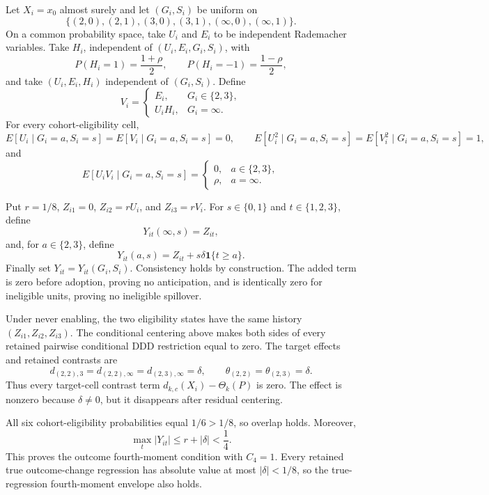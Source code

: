 Let \(X_i=x_0\) almost surely and let \((G_i,S_i)\) be uniform on
\[
 \{(2,0),(2,1),(3,0),(3,1),(\infty,0),(\infty,1)\}.
\]
On a common probability space, take \(U_i\) and \(E_i\) to be independent Rademacher variables.  Take \(H_i\), independent of \((U_i,E_i,G_i,S_i)\), with
\[
 P(H_i=1)=\frac{1+\rho}{2},
 \qquad
 P(H_i=-1)=\frac{1-\rho}{2},
\]
and take \((U_i,E_i,H_i)\) independent of \((G_i,S_i)\).  Define
\[
 V_i=
 \begin{cases}
 E_i,&G_i\in\{2,3\},\\
 U_iH_i,&G_i=\infty.
 \end{cases}
\]
For every cohort-eligibility cell,
\[
 E[U_i\mid G_i=a,S_i=s]=E[V_i\mid G_i=a,S_i=s]=0,
 \qquad
 E[U_i^2\mid G_i=a,S_i=s]=E[V_i^2\mid G_i=a,S_i=s]=1,
\]
and
\[
 E[U_iV_i\mid G_i=a,S_i=s]
 =\begin{cases}
 0,&a\in\{2,3\},\\
 \rho,&a=\infty.
 \end{cases}
\]

Put \(r=1/8\), \(Z_{i1}=0\), \(Z_{i2}=rU_i\), and \(Z_{i3}=rV_i\).  For \(s\in\{0,1\}\) and \(t\in\{1,2,3\}\), define
\[
 Y_{it}(\infty,s)=Z_{it},
\]
and, for \(a\in\{2,3\}\), define
\[
 Y_{it}(a,s)=Z_{it}+s\delta\mathbf 1\{t\ge a\}.
\]
Finally set \(Y_{it}=Y_{it}(G_i,S_i)\).  Consistency holds by construction.  The added term is zero before adoption, proving no anticipation, and is identically zero for ineligible units, proving no ineligible spillover.

Under never enabling, the two eligibility states have the same history \((Z_{i1},Z_{i2},Z_{i3})\).  The conditional centering above makes both sides of every retained pairwise conditional DDD restriction equal to zero.  The target effects and retained contrasts are
\[
 d_{(2,2),3}=d_{(2,2),\infty}
 =d_{(2,3),\infty}=\delta,
 \qquad
 \theta_{(2,2)}=\theta_{(2,3)}=\delta.
\]
Thus every target-cell contrast term \(d_{k,c}(X_i)-\Theta_k(P)\) is zero.  The effect is nonzero because \(\delta\ne0\), but it disappears after residual centering.

All six cohort-eligibility probabilities equal \(1/6>1/8\), so overlap holds.  Moreover,
\[
 \max_t|Y_{it}|\le r+|\delta|<\frac14.
\]
This proves the outcome fourth-moment condition with \(C_4=1\).  Every retained true outcome-change regression has absolute value at most \(|\delta|<1/8\), so the true-regression fourth-moment envelope also holds.

